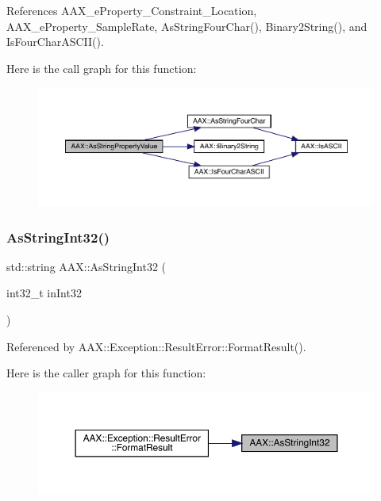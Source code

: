References A\+A\+X\+\_\+e\+Property\+\_\+\+Constraint\+\_\+\+Location, A\+A\+X\+\_\+e\+Property\+\_\+\+Sample\+Rate, As\+String\+Four\+Char(), Binary2\+String(), and Is\+Four\+Char\+A\+S\+C\+I\+I().

Here is the call graph for this function\+:
\nopagebreak
\begin{figure}[H]
\begin{center}
\leavevmode
\includegraphics[width=350pt]{a00852_a1b3d4b5a967f01922963876447644b15_cgraph}
\end{center}
\end{figure}
\mbox{\label{a00852_ab024a3d9ac9c68350b377b2c70ec4727}} 
\subsubsection{\texorpdfstring{AsStringInt32()}{AsStringInt32()}}
{\footnotesize\ttfamily std\+::string A\+A\+X\+::\+As\+String\+Int32 (\begin{DoxyParamCaption}\item[{int32\+\_\+t}]{in\+Int32 }\end{DoxyParamCaption})\hspace{0.3cm}{\ttfamily [inline]}}



Referenced by A\+A\+X\+::\+Exception\+::\+Result\+Error\+::\+Format\+Result().

Here is the caller graph for this function\+:
\nopagebreak
\begin{figure}[H]
\begin{center}
\leavevmode
\includegraphics[width=350pt]{a00852_ab024a3d9ac9c68350b377b2c70ec4727_icgraph}
\end{center}
\end{figure}
\mbox{\label{a00852_ada4fd7cb0e04582a7615a76f6be7e404}} 
